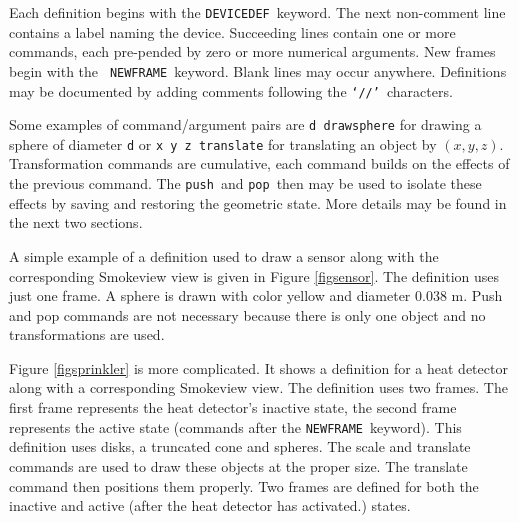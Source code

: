 \documentclass[11pt,twoside]{book}
\begin{document}
Each definition begins with the {\tt DEVICEDEF}\ keyword.  The
next non-comment line contains a label naming the device.
Succeeding lines contain one or more commands, each pre-pended by
zero or more numerical arguments.   New frames begin with the {\tt
NEWFRAME}\ keyword.  Blank lines may occur anywhere.  Definitions
may be documented by adding comments following the {\tt `//'}\
characters.

Some examples of command/argument pairs are {\tt d drawsphere} for
drawing a sphere of diameter {\tt d} or {\tt x y z translate} for
translating an object by $(x,y,z)$. Transformation commands are
cumulative, each command builds on the effects of the previous
command.  The {\tt push}\ and {\tt pop}\ then may be used to
isolate these effects by saving and restoring the geometric state.
More details may be found in the next two sections.

A simple example of a definition used to draw a sensor along with
the corresponding Smokeview view is given in Figure
\ref{figsensor}. The definition uses just one frame. A sphere is
drawn with color yellow and diameter 0.038 m. Push and pop commands
are not necessary because there is only one object and no
transformations are used.

Figure \ref{figsprinkler} is more complicated. It shows a
definition for a heat detector along with a corresponding
Smokeview view. The definition uses two frames. The first frame
represents the heat detector's inactive state, the second frame
represents the active state (commands after the {\tt NEWFRAME}\
keyword). This definition uses disks, a truncated cone and spheres.
The scale and translate commands are used to draw these objects at the proper size.
The translate command then positions them properly.  Two frames are defined for both the inactive and active (after the heat
detector has activated.) states.
\end{document}
